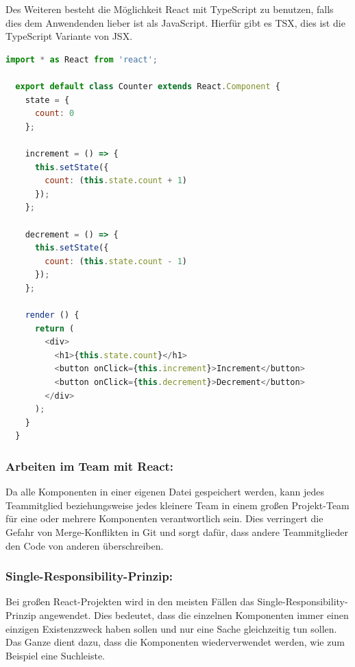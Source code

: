 Des Weiteren besteht die Möglichkeit React mit TypeScript zu benutzen, falls dies dem Anwendenden lieber ist als JavaScript. Hierfür gibt es TSX, dies ist die TypeScript Variante von JSX.

\begin{lstlisting}[language=JavaScript, caption=Beispiel-Code eines Click Counters in TSX label=lst:impl:TSXcounter]
  import * as React from 'react';

  export default class Counter extends React.Component {
    state = {
      count: 0
    };

    increment = () => {
      this.setState({
        count: (this.state.count + 1)
      });
    };

    decrement = () => {
      this.setState({
        count: (this.state.count - 1)
      });
    };

    render () {
      return (
        <div>
          <h1>{this.state.count}</h1>
          <button onClick={this.increment}>Increment</button>
          <button onClick={this.decrement}>Decrement</button>
        </div>
      );
    }
  }
\end{lstlisting} \cite{ReactWithoutJSX2}

\subsubsection{Arbeiten im Team mit React:}
Da alle Komponenten in einer eigenen Datei gespeichert werden, kann jedes Teammitglied beziehungsweise jedes kleinere Team in einem großen Projekt-Team für eine oder mehrere Komponenten verantwortlich sein. Dies verringert die Gefahr von Merge-Konflikten in Git und sorgt dafür, dass andere Teammitglieder den Code von anderen überschreiben.
\cite{PropsAndComponents2}

\subsubsection{Single-Responsibility-Prinzip:}
Bei großen React-Projekten wird in den meisten Fällen das Single-Responsibility-Prinzip angewendet. Dies bedeutet, dass die einzelnen Komponenten immer einen einzigen Existenzzweck haben sollen und nur eine Sache gleichzeitig tun sollen. Das Ganze dient dazu, dass die Komponenten wiederverwendet werden, wie zum Beispiel eine Suchleiste.
\cite{SRP}

